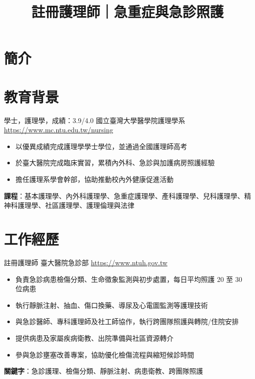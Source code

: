 \documentclass[a4paper, serif, 10pt]{moderncv}
\title{註冊護理師｜急重症與急診照護}
\begin{document}
\maketitle

\section{簡介}

\section{教育背景}

        {學士，護理學，成績：3.9/4.0}
        {國立臺灣大學醫學院護理學系}
        {\url{https://www.mc.ntu.edu.tw/nursing}}
        {}
        {\begin{itemize}
\item 以優異成績完成護理學學士學位，並通過全國護理師高考
\item 於臺大醫院完成臨床實習，累積內外科、急診與加護病房照護經驗
\item 擔任護理系學會幹部，協助推動校內外健康促進活動
\end{itemize}
\textbf{課程}：基本護理學、內外科護理學、急重症護理學、產科護理學、兒科護理學、精神科護理學、社區護理學、護理倫理與法律}
\section{工作經歷}

        {註冊護理師}
        {臺大醫院急診部}
        {\url{https://www.ntuh.gov.tw}}
        {}
        {\begin{itemize}
\item 負責急診病患檢傷分類、生命徵象監測與初步處置，每日平均照護 20 至 30 位病患
\item 執行靜脈注射、抽血、傷口換藥、導尿及心電圖監測等護理技術
\item 與急診醫師、專科護理師及社工師協作，執行跨團隊照護與轉院/住院安排
\item 提供病患及家屬疾病衛教、出院準備與社區資源轉介
\item 參與急診壅塞改善專案，協助優化檢傷流程與縮短候診時間
\end{itemize}
\textbf{關鍵字}：急診護理、檢傷分類、靜脈注射、病患衛教、跨團隊照護}
\end{document}
